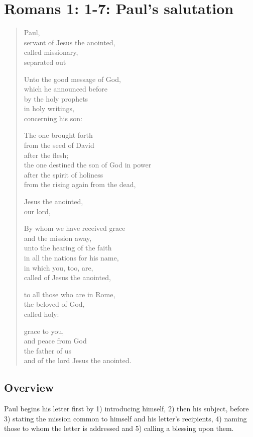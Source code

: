 \chapter{Romans 1: 1-7: Paul's salutation}

\begin{quote}
Paul, 
\\servant of Jesus the anointed, 
\\called missionary, 
\\separated out 

Unto the good message of God,
\\which he announced before 
\\by the holy prophets 
\\in holy writings, 
\\concerning his son:

The one brought forth 
\\from the seed of David 
\\after the flesh; 
\\the one destined the son of God in power 
\\after the spirit of holiness 
\\from the rising again from the dead, 

Jesus the anointed, 
\\our lord, 

By whom we have received grace 
\\and the mission away, 
\\unto the hearing of the faith 
\\in all the nations for his name, 
\\in which you, too, are, 
\\called of Jesus the anointed, 

to all those who are in Rome, 
\\the beloved of God, 
\\called holy: 

grace to you, 
\\and peace from God 
\\the father of us 
\\and of the lord Jesus the anointed.
\end{quote}

\section{Overview}
Paul begins his letter first by 1) introducing himself, 2) then his subject, before 3) stating the mission common to himself and his letter's recipients, 4) naming those to whom the letter is addressed and 5) calling a blessing upon them. 


